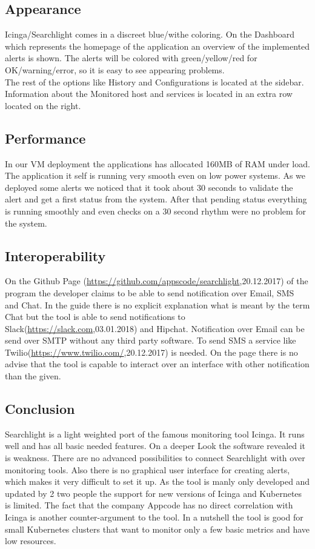 \subsection{Appearance}
Icinga/Searchlight comes in a  discreet blue/withe coloring. On the Dashboard which represents the homepage of the application an overview of the implemented alerts is shown. The alerts will be colored with green/yellow/red for OK/warning/error, so it is easy to see appearing problems.\\
 The rest of the options like History and Configurations is located at the sidebar. Information about the Monitored host and services is located in an extra row located on the right.
\subsection{Performance}
In our VM deployment the applications has allocated 160MB of RAM under load. The application it self is running very smooth even on low power systems. As we deployed some alerts we noticed that it took about 30 seconds to validate the alert and get a first status from the system. After that pending status everything is running smoothly and even checks on a 30 second rhythm were no problem for the system.
\subsection{Interoperability}
On the Github Page (\url{https://github.com/appscode/searchlight},20.12.2017) of the program the developer claims to be able to send notification over Email, SMS and Chat.
In the guide there is no explicit explanation what is meant by the term Chat but the tool is able to send notifications to Slack(\url{https://slack.com},03.01.2018) and Hipchat. Notification over Email can be send over SMTP without any third party software. To send SMS a service like Twilio(\url{https://www.twilio.com/},20.12.2017) is needed.
On the page there is no advise that the tool is capable to interact over an interface with other notification than the given. 
\subsection{Conclusion}
Searchlight is a light weighted  port of the famous monitoring tool Icinga. It runs well and has all basic needed features. On a deeper Look the software revealed it is weakness. There are no advanced possibilities to connect Searchlight with over monitoring tools. Also there is no graphical user interface for creating alerts, which makes it very difficult to set it up. As the tool is manly only developed and updated by 2 two people the support for new versions of Icinga and Kubernetes is limited. The fact that the company Appcode has no direct correlation with Icinga is another counter-argument to the tool. In a nutshell the tool is good for small Kubernetes clusters that want to monitor only a few basic metrics and have low resources. 

